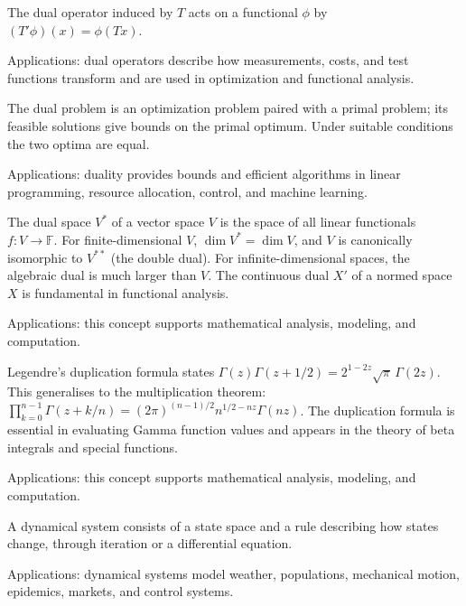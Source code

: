 The dual operator induced by $T$ acts on a functional $\phi$ by $(T'\phi)(x)=\phi(Tx)$. \par\noindent Applications: dual operators describe how measurements, costs, and test functions transform and are used in optimization and functional analysis.

The dual problem is an optimization problem paired with a primal problem; its feasible solutions give bounds on the primal optimum. Under suitable conditions the two optima are equal. \par\noindent Applications: duality provides bounds and efficient algorithms in linear programming, resource allocation, control, and machine learning.

The dual space $V^*$ of a vector space $V$ is the space of all linear functionals $f: V \to \mathbb{F}$. For finite-dimensional $V$, $\dim V^* = \dim V$, and $V$ is canonically isomorphic to $V^{**}$ (the double dual). For infinite-dimensional spaces, the algebraic dual is much larger than $V$. The continuous dual $X'$ of a normed space $X$ is fundamental in functional analysis. \par\noindent Applications: this concept supports mathematical analysis, modeling, and computation.

Legendre's duplication formula states $\Gamma(z)\Gamma(z + 1/2) = 2^{1-2z}\sqrt{\pi}\,\Gamma(2z)$. This generalises to the multiplication theorem: $\prod_{k=0}^{n-1} \Gamma(z + k/n) = (2\pi)^{(n-1)/2} n^{1/2-nz} \Gamma(nz)$. The duplication formula is essential in evaluating Gamma function values and appears in the theory of beta integrals and special functions. \par\noindent Applications: this concept supports mathematical analysis, modeling, and computation.

A dynamical system consists of a state space and a rule describing how states change, through iteration or a differential equation. \par\noindent Applications: dynamical systems model weather, populations, mechanical motion, epidemics, markets, and control systems.
